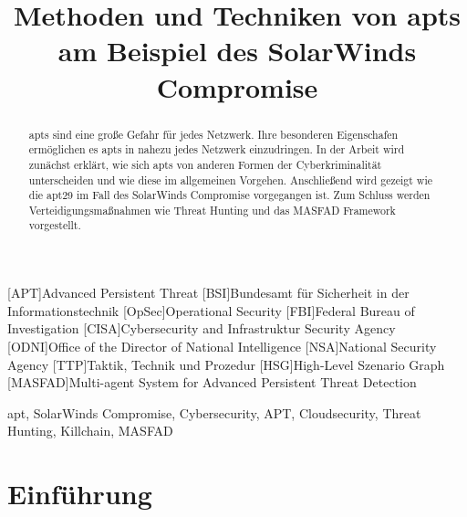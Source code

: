 \documentclass[conference]{IEEEtran}
\begin{document}
\begin{acronym}
    [APT]{Advanced Persistent Threat}
    [BSI]{Bundesamt für Sicherheit in der Informationstechnik}
    [OpSec]{Operational Security}
    [FBI]{Federal Bureau of Investigation}
    [CISA]{Cybersecurity and Infrastruktur Security Agency}
    [ODNI]{Office of the Director of National Intelligence}
    [NSA]{National Security Agency}
    [TTP]{Taktik, Technik und Prozedur}
    [HSG]{High-Level Szenario Graph}
    [MASFAD]{Multi-agent System for Advanced Persistent Threat Detection}
\end{acronym}


\title{Methoden und Techniken von \aclp*{apt} am Beispiel des SolarWinds Compromise
}

\author{
}

\maketitle

\begin{abstract}
    \acp{apt} sind eine große Gefahr für jedes Netzwerk. Ihre besonderen Eigenschafen ermöglichen es \acp{apt} in nahezu jedes Netzwerk einzudringen.
    In der Arbeit wird zunächst erklärt, wie sich \acp{apt} von anderen Formen der Cyberkriminalität unterscheiden und wie diese im allgemeinen Vorgehen.
    Anschließend wird gezeigt wie die \ac{apt}29 im Fall des SolarWinds Compromise vorgegangen ist.
    Zum Schluss werden Verteidigungsmaßnahmen wie Threat Hunting und das MASFAD Framework vorgestellt.
\end{abstract}

\begin{IEEEkeywords}
    \ac{apt}, SolarWinds Compromise, Cybersecurity, APT, Cloudsecurity, Threat Hunting, Killchain, MASFAD
\end{IEEEkeywords}

\section{Einführung}
\label{sec:introduction}
\end{document}
